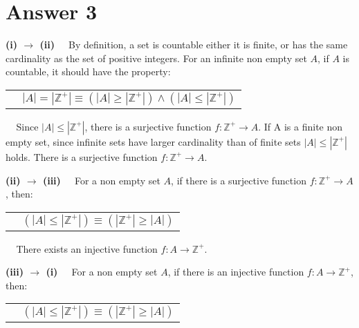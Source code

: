 \documentclass[11pt]{article}
\begin{document}
\section*{Answer 3}
\begin{flushleft}
    \textbf{(i) $\rightarrow$ (ii)} $\>\>\>\>\>$By definition, a set is countable either it is finite, or has the same cardinality as the set of positive integers. For an infinite non empty set $A$, if $A$ is countable, it should have the property: \\     
\end{flushleft}
\begin{tabular}{l l}
    & $|A|=|\mathbb{Z}^{+}| \equiv (|A|\geq|\mathbb{Z}^{+}|) \land (|A|\leq|\mathbb{Z}^{+}|)$\\
\end{tabular}
\begin{flushleft}
    $\>\>\>\>\>$Since $|A|\leq|\mathbb{Z}^{+}|$, there is a surjective function $f:\mathbb{Z}^{+} \rightarrow A$. 
    If A is a finite non empty set, since infinite sets have larger cardinality than of finite sets $|A|\leq|\mathbb{Z}^{+}|$ holds. There is a surjective function $f:\mathbb{Z}^{+} \rightarrow A$.\\    
\end{flushleft}
\begin{flushleft}
    \textbf{(ii) $\rightarrow$ (iii)} $\>\>\>\>\>$For a non empty set $A$, if there is a surjective function $f:\mathbb{Z}^{+} \rightarrow A$, then:\\
\end{flushleft}
\begin{tabular}{l l}
    & $(|A|\leq|\mathbb{Z}^{+}|) \equiv (|\mathbb{Z}^{+}|\geq|A|)$\\
\end{tabular}
\begin{flushleft}
    $\>\>\>\>\>$There exists an injective function $f:A \rightarrow \mathbb{Z}^{+}$.\\
\end{flushleft}
\begin{flushleft}
    \textbf{(iii) $\rightarrow$ (i)} $\>\>\>\>\>$For a non empty set $A$, if there is an injective function $f:A \rightarrow \mathbb{Z}^{+}$, then:\\
\end{flushleft}
\begin{tabular}{l l}
    & $(|A|\leq|\mathbb{Z}^{+}|) \equiv (|\mathbb{Z}^{+}|\geq|A|)$\\
\end{tabular}
\end{document}
